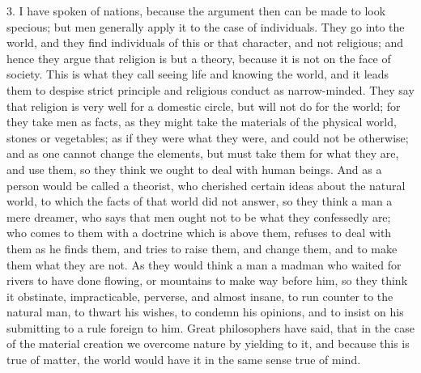 3. I have spoken of nations, because the argument then can be made
to look specious; but men generally apply it to the case of
individuals. They go into the world, and they find individuals of this
or that character, and not religious; and hence they argue that
religion is but a theory, because it is not on the face of society.
This is what they call seeing life and knowing the world, and it leads
them to despise strict principle and religious conduct as
narrow-minded. They say that religion is very well for a domestic
circle, but will not do for the world; for they take men as facts, as
they might take the materials of the physical world, stones or
vegetables; as if they were what they were, and could not be
otherwise; and as one cannot change the elements, but must take them
for what they are, and use them, so they think we ought to deal with
human beings. And as a person would be called a theorist, who
cherished certain ideas about the natural world, to which the facts of
that world did not answer, so they think a man a mere dreamer, who
says that men ought not to be what they confessedly are; who comes to
them with a doctrine which is above them, refuses to deal with them as
he finds them, and tries to raise them, and change them, and to make
them what they are not. As they would think a man a madman who waited
for rivers to have done flowing, or mountains to make way before him,
so they think it obstinate, impracticable, perverse, and almost
insane, to run counter to the natural man, to thwart his wishes, to
condemn his opinions, and to insist on his submitting to a rule
foreign to him. Great philosophers have said, that in the case of the
material creation we overcome nature by yielding to it, and because
this is true of matter, the world would have it in the same sense true
of mind.

